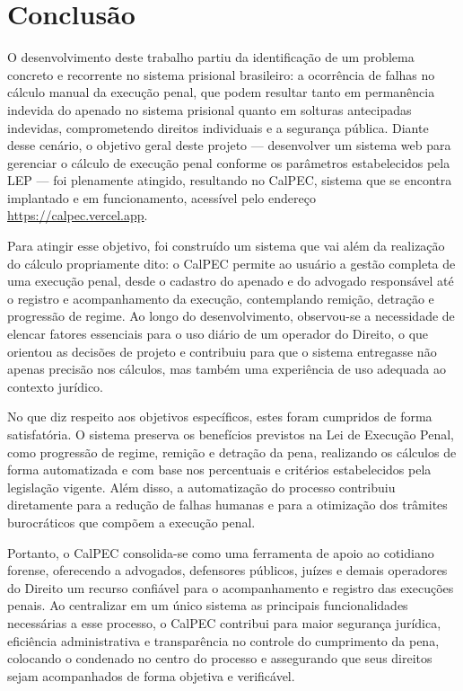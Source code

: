 \chapter{Conclusão}
O desenvolvimento deste trabalho partiu da identificação de um problema concreto e recorrente no sistema prisional brasileiro: a ocorrência de falhas no cálculo manual da execução penal, que podem resultar tanto em permanência indevida do apenado no sistema prisional quanto em solturas antecipadas indevidas, comprometendo direitos individuais e a segurança pública. Diante desse cenário, o objetivo geral deste projeto --- desenvolver um sistema web para gerenciar o cálculo de execução penal conforme os parâmetros estabelecidos pela LEP --- foi plenamente atingido, resultando no CalPEC, sistema que se encontra implantado e em funcionamento, acessível pelo endereço \url{https://calpec.vercel.app}.

Para atingir esse objetivo, foi construído um sistema que vai além da realização do cálculo propriamente dito: o CalPEC permite ao usuário a gestão completa de uma execução penal, desde o cadastro do apenado e do advogado responsável até o registro e acompanhamento da execução, contemplando remição, detração e progressão de regime. Ao longo do desenvolvimento, observou-se a necessidade de elencar fatores essenciais para o uso diário de um operador do Direito, o que orientou as decisões de projeto e contribuiu para que o sistema entregasse não apenas precisão nos cálculos, mas também uma experiência de uso adequada ao contexto jurídico.

No que diz respeito aos objetivos específicos, estes foram cumpridos de forma satisfatória. O sistema preserva os benefícios previstos na Lei de Execução Penal, como progressão de regime, remição e detração da pena, realizando os cálculos de forma automatizada e com base nos percentuais e critérios estabelecidos pela legislação vigente. Além disso, a automatização do processo contribuiu diretamente para a redução de falhas humanas e para a otimização dos trâmites burocráticos que compõem a execução penal.

Portanto, o CalPEC consolida-se como uma ferramenta de apoio ao cotidiano forense, oferecendo a advogados, defensores públicos, juízes e demais operadores do Direito um recurso confiável para o acompanhamento e registro das execuções penais. Ao centralizar em um único sistema as principais funcionalidades necessárias a esse processo, o CalPEC contribui para maior segurança jurídica, eficiência administrativa e transparência no controle do cumprimento da pena, colocando o condenado no centro do processo e assegurando que seus direitos sejam acompanhados de forma objetiva e verificável.

